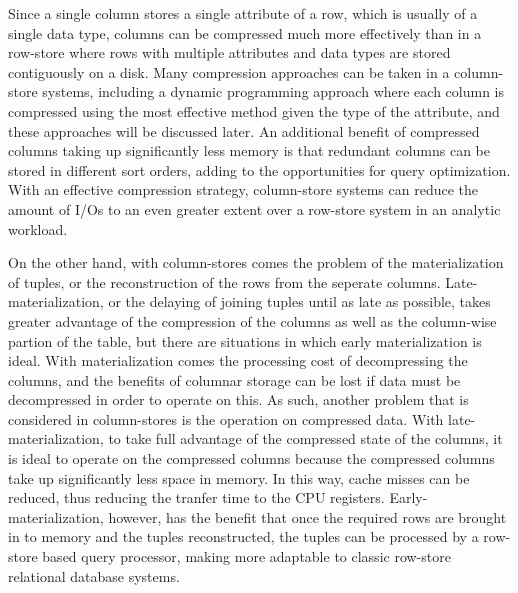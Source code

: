 Since a single column stores a single attribute of a row, which is usually of a single data type, columns can be compressed much more effectively than in a row-store where rows with multiple attributes and data types are stored contiguously on a disk. Many compression approaches can be taken in a column-store systems, including a dynamic programming approach where each column is compressed using the most effective method given the type of the attribute, and these approaches will be discussed later. An additional benefit of compressed columns taking up significantly less memory is that redundant columns can be stored in different sort orders, adding to the opportunities for query optimization\cite{now}. With an effective compression strategy, column-store systems can reduce the amount of I/Os to an even greater extent over a row-store system in an analytic workload.


On the other hand, with column-stores comes the problem of the materialization of tuples, or the reconstruction of the rows from the seperate columns\cite{now}. Late-materialization, or the delaying of joining tuples until as late as possible, takes greater advantage of the compression of the columns as well as the column-wise partion of the table, but there are situations in which early materialization is ideal. With materialization comes the processing cost of decompressing the columns, and the benefits of columnar storage can be lost if data must be decompressed in order to operate on this. As such, another problem that is considered in column-stores is the operation on compressed data\cite{now}. With late-materialization, to take full advantage of the compressed state of the columns, it is ideal to operate on the compressed columns because the compressed columns take up significantly less space in memory. In this way, cache misses can be reduced, thus reducing the tranfer time to the CPU registers\cite{slides}. Early-materialization, however, has the benefit that once the required rows are brought in to memory and the tuples reconstructed, the tuples can be processed by a row-store based query processor, making more adaptable to classic row-store relational database systems.





